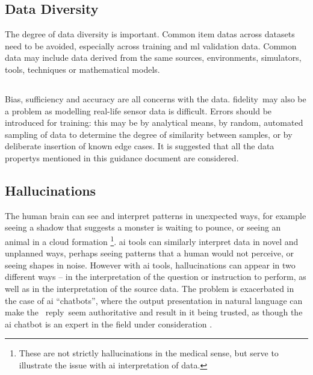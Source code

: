 \subsection{Data Diversity}
The degree of data diversity is important. Common \glspl{item data} across \glspl{dataset} need to be avoided, especially across training and
\gls{ml}
validation data. Common data may include data derived from the same sources, environments, simulators, tools, techniques or mathematical models.

\subsection{}
Bias, sufficiency and \gls{accuracy} are all concerns with the data. \cbstart\gls{fidelity}\cbend\ may also be a problem as modelling real-life sensor data is difficult.  Errors should be introduced for training: this may be by analytical means, by random, automated sampling of data to determine the degree of similarity between samples, or by deliberate insertion of known edge cases. 
It is suggested that all the \glspl{data property} mentioned in this guidance document are considered.

\subsection{Hallucinations}
\label{bkm:MachineLearning:Hallucinations}
%
The human brain can see and interpret patterns in unexpected ways, for example seeing a shadow that
suggests a monster is waiting to pounce, or seeing an animal in a cloud formation%
\footnote{These are not strictly hallucinations in the medical sense, but serve to illustrate
the issue with \gls{ai} interpretation of data.}.
\Gls{ai} tools can similarly interpret data in novel and unplanned ways, perhaps seeing patterns that a
human would not perceive, or seeing shapes in noise. However with \gls{ai} tools, hallucinations can appear
in two different ways -- in the interpretation of the question or instruction to perform, as well as
in the interpretation of the source data.
The problem is exacerbated in the case of \gls{ai} ``chatbots'', where the output presentation in natural
language can make the \cbstart\ reply\cbend\ seem authoritative and result in it being trusted, as though the
\gls{ai} chatbot is an expert in the field under consideration \cite{citation:chatbotsterrible:website}. 

